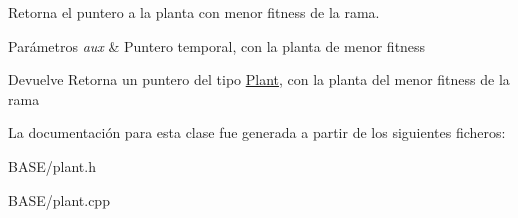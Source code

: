 Retorna el puntero a la planta con menor fitness de la rama. 


\begin{DoxyParams}{Parámetros}
{\em aux} & Puntero temporal, con la planta de menor fitness\\
\hline
\end{DoxyParams}
\begin{DoxyReturn}{Devuelve}
Retorna un puntero del tipo \hyperlink{class_plant}{Plant}, con la planta del menor fitness de la rama 
\end{DoxyReturn}


La documentación para esta clase fue generada a partir de los siguientes ficheros\+:\begin{DoxyCompactItemize}
\item 
B\+A\+S\+E/plant.\+h\item 
B\+A\+S\+E/plant.\+cpp\end{DoxyCompactItemize}
